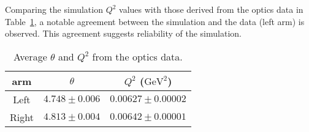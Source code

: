 \begin{comment}
I am doubting if I was comparing the same thing. 
In data, $Q^2$ was calculated as:
$$ Q^2 = 2*beamE*P*(1-\cos(\theta))$$
where beamE was the average beam energy (before hitting the target), 
and P was the reconstructed beam energy, or post-target energy 
and $\theta$ was the reconstructed scattering angle 

But in simulation, $Q^2$ was calculated as:
$$ Q^2 = 2*E*Ef*(1-\cos(\theta)) $$
where E was the post vertex beam energy: I made a mistake here, E should be 
pre-vertex beam energy.
$$ Ef = M*E/(M + E*(1-cos(th))) $$
was the theoretical beam energy after elastic scattering and $\theta$ was 
the scattering angle.

Obviously, data and simulation had different definitions:
$$ beamE > E	\quad P < E	\quad P \stacker{?}{\sim} $$
The only good news was that beamE, E, P, Ef were all close to each other. Overall,
the simulation would make the simulation $Q^2$ smaller than that of data. Not
sure how large the uncertainty was.

The only difference here for vertex and post-vertex was the scattering angle,
one was the vertex angle and the other being the post-target scattering angle.

The CREX analysis was comparing the same thing.
\end{comment}

Comparing the simulation $Q^2$ values with those derived from the optics data 
in Table~\ref{tab:prex_C_contam_Q2}, a notable agreement between the simulation 
and the data (left arm) is observed. This agreement suggests reliability of the simulation.
\begin{table}
    \centering
    \begin{tabular}{c | c c}
	\hline
	arm & $\theta$	& $Q^2$ ($\mathrm{GeV}^2$)   \\
	\hline
	Left	& $4.748 \pm 0.006$ & $0.00627 \pm 0.00002$	\\
	Right	& $4.813 \pm 0.004$ & $0.00642 \pm 0.00001$	\\
	\hline
    \end{tabular}
    \caption{Average $\theta$ and $Q^2$ from the optics data.
    }
    \label{tab:prex_C_contam_Q2}
\end{table}

